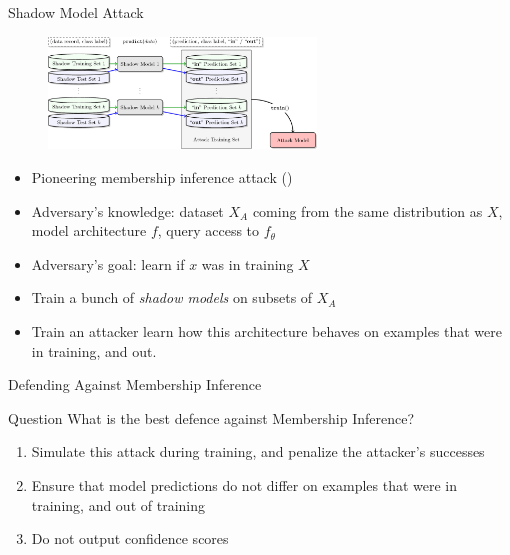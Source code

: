 \documentclass[10pt]{beamer}
\begin{document}
\begin{frame}{Shadow Model Attack}

  \begin{figure}
    \includegraphics[width=2.8in]{shadows.png} \\
  \end{figure}

  \begin{itemize}[<+-| alert@+>]
    \item Pioneering membership inference attack (\cite{ShokriSS16})
    \item Adversary's knowledge: dataset $X_A$ coming from the same distribution as $X$, model
        architecture $f$, query access to $f_{\theta}$
    \item Adversary's goal: learn if $x$ was in training $X$
    \item Train a bunch of \emph{shadow models} on subsets of $X_A$
    \item Train an attacker learn how this
        architecture behaves on examples that were in training, and out.
  \end{itemize}
\end{frame}


\begin{frame}{Defending Against Membership Inference}
  \begin{alertblock}{Question}
    What is the best defence against Membership Inference?
  \end{alertblock}

  \begin{enumerate}[<+-| alert@+>]
    \item Simulate this attack during training, and penalize the attacker's successes
    \item Ensure that model predictions do not differ on examples that were in training, and out of
        training
    \item Do not output confidence scores
  \end{enumerate}
\end{frame}
\end{document}
